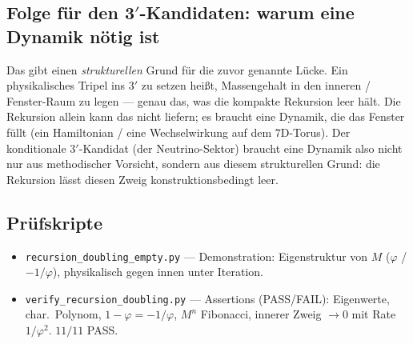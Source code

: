 \subsection{Folge f\"ur den 3$'$-Kandidaten: warum eine Dynamik n\"otig ist}
Das gibt einen \emph{strukturellen} Grund f\"ur die zuvor genannte L\"ucke. Ein physikalisches
Tripel ins $3'$ zu setzen hei\ss t, Massengehalt in den inneren / Fenster-Raum zu legen --- genau
das, was die kompakte Rekursion leer h\"alt. Die Rekursion allein kann das nicht liefern; es
braucht eine Dynamik, die das Fenster f\"ullt (ein Hamiltonian / eine Wechselwirkung auf dem
$7$D-Torus). Der konditionale $3'$-Kandidat (der Neutrino-Sektor) braucht eine Dynamik also nicht
nur aus methodischer Vorsicht, sondern aus diesem strukturellen Grund: die Rekursion l\"asst
diesen Zweig konstruktionsbedingt leer.

\subsection{Pr\"ufskripte}
\begin{itemize}
\item \texttt{recursion\_doubling\_empty.py} --- Demonstration: Eigenstruktur von $M$
($\varphi$ / $-1/\varphi$), physikalisch gegen innen unter Iteration.
\item \texttt{verify\_recursion\_doubling.py} --- Assertions (PASS/FAIL): Eigenwerte,
char.\ Polynom, $1-\varphi=-1/\varphi$, $M^n$ Fibonacci, innerer Zweig $\to0$ mit Rate
$1/\varphi^2$. $11/11$ PASS.
\end{itemize}


